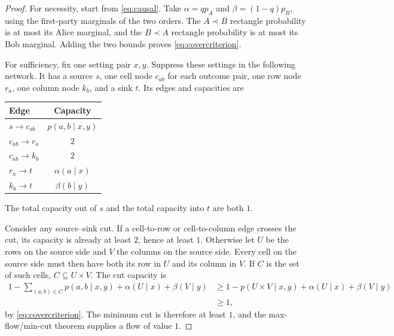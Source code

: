\documentclass[11pt,letterpaper]{article}
\theoremstyle{remark}\newtheorem{remark}[theorem]{Remark}
\begin{document}
\begin{proof}
For necessity, start from \eqref{eq:causal}. Take
$\alpha=q p_A$ and $\beta=(1-q)p_B$, using the first-party marginals of the two orders. The $A\prec B$ rectangle probability is at most its Alice marginal, and the $B\prec A$ rectangle probability is at most its Bob marginal. Adding the two bounds proves \eqref{eq:covercriterion}.

For sufficiency, fix one setting pair $x,y$. Suppress these settings in the following network. It has a source $s$, one cell node $c_{ab}$ for each outcome pair, one row node $r_a$, one column node $k_b$, and a sink $t$. Its edges and capacities are
\begin{center}
\begin{tabular}{@{}lc@{}}
\toprule
Edge & Capacity\\
\midrule
$s\longrightarrow c_{ab}$ & $p(a,b\mid x,y)$\\
$c_{ab}\longrightarrow r_a$ & $2$\\
$c_{ab}\longrightarrow k_b$ & $2$\\
$r_a\longrightarrow t$ & $\alpha(a\mid x)$\\
$k_b\longrightarrow t$ & $\beta(b\mid y)$\\
\bottomrule
\end{tabular}
\end{center}
The total capacity out of $s$ and the total capacity into $t$ are both $1$.

Consider any source--sink cut. If a cell-to-row or cell-to-column edge crosses the cut, its capacity is already at least $2$, hence at least $1$. Otherwise let $U$ be the rows on the source side and $V$ the columns on the source side. Every cell on the source side must then have both its row in $U$ and its column in $V$. If $C$ is the set of such cells, $C\subseteq U\times V$. The cut capacity is
\begin{align*}
 1-\sum_{(a,b)\in C}p(a,b\mid x,y)
     +\alpha(U\mid x)+\beta(V\mid y)
 &\ge 1-p(U\times V\mid x,y)
     +\alpha(U\mid x)+\beta(V\mid y)\\
 &\ge1,
\end{align*}
by \eqref{eq:covercriterion}. The minimum cut is therefore at least $1$, and the max-flow/min-cut theorem supplies a flow of value $1$.


\end{proof}
\end{document}
